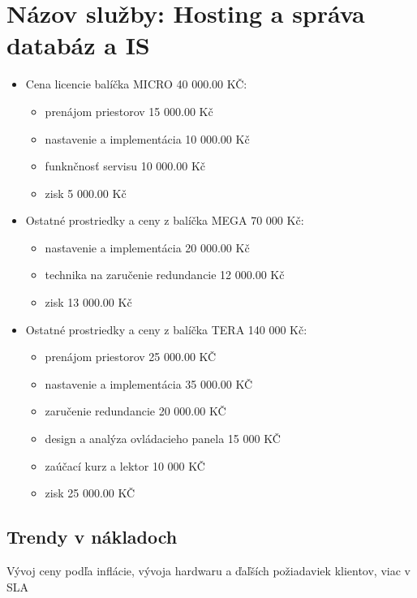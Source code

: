 \documentclass[a4paper, 11pt]{article}
\begin{document}
\section*{Názov služby: Hosting a správa databáz a IS}
\begin{itemize}
\item Cena licencie balíčka MICRO 40 000.00 KČ:
\begin{itemize}
\item prenájom priestorov 15 000.00 Kč
\item nastavenie a implementácia 10 000.00 Kč
\item funknčnosť servisu 10 000.00 Kč
\item zisk 5 000.00 Kč
\end{itemize}

\item  Ostatné prostriedky a ceny z balíčka MEGA 70 000 Kč:
\begin{itemize}
\item nastavenie a implementácia 20 000.00 Kč 
\item technika na zaručenie redundancie 12 000.00 Kč
\item zisk 13 000.00 Kč
\end{itemize}


\item  Ostatné prostriedky a ceny z balíčka TERA 140 000 Kč:
\begin{itemize}
\item prenájom priestorov 25 000.00 KČ
\item nastavenie a implementácia 35 000.00 KČ
\item zaručenie redundancie 20 000.00 KČ
\item design a analýza ovládacieho panela 15 000 KČ
\item zaúčací kurz a lektor 10 000 KČ
\item zisk 25 000.00 KČ
\end{itemize}


\end{itemize}

\subsection*{Trendy v nákladoch}
Vývoj ceny podľa inflácie, vývoja hardwaru a ďaľších požiadaviek klientov, viac v SLA
\end{document}
